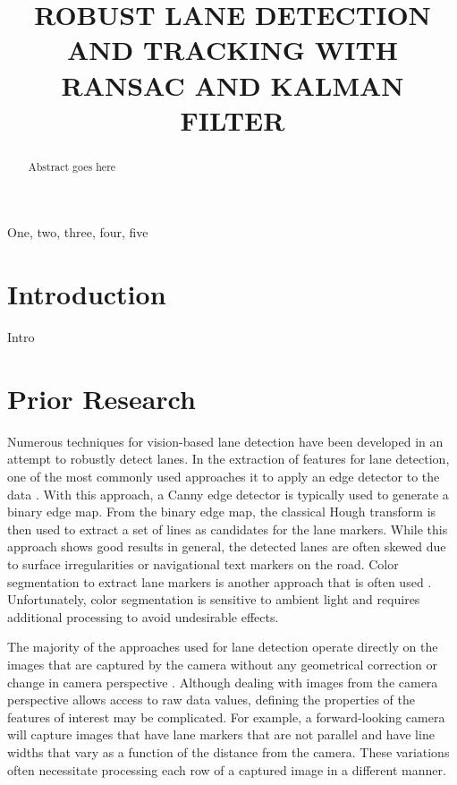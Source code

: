 \documentclass{article}
\title{ROBUST LANE DETECTION AND TRACKING WITH RANSAC AND KALMAN FILTER}
\begin{document}
%
\maketitle
%
\begin{abstract}
Abstract goes here
\end{abstract}
%
\begin{keywords}
One, two, three, four, five
\end{keywords}
%
\section{Introduction}
\label{sec:intro}
Intro

\section{Prior Research}
\label{sec:prior}
Numerous techniques for vision-based lane detection have been developed in an attempt to robustly detect lanes.
In the extraction of features for lane detection, one of the most commonly used approaches it to apply an edge detector to the data \cite{assidiq_real_2008,wang_driver_2005}. With this approach, a Canny edge detector is typically used to generate a binary edge map. From the binary edge map, the classical Hough transform is then used to extract a set of lines as candidates for the lane markers.  While this approach shows good results in general, the detected lanes are often skewed due to surface irregularities or navigational text markers on the road. Color segmentation to extract lane markers is another approach that is often used \cite{sun_hsi_2006,chin_lane_2005}. Unfortunately, color segmentation is sensitive to ambient light and requires additional processing to avoid undesirable effects.

The majority of the approaches used for lane detection operate directly on the images that are captured by the camera without any geometrical correction or change in camera perspective \cite{borkar_layered_2009,assidiq_real_2008,sun_hsi_2006,wang_real-time_2006}.
Although dealing with images from the camera perspective allows access to raw data values, defining the properties of the features of interest may be complicated. For example, a forward-looking camera will capture images that have lane markers that are not parallel and have line widths that vary as a function of the distance from the camera.  These variations often necessitate processing each row of a captured image in a different manner.
\end{document}
